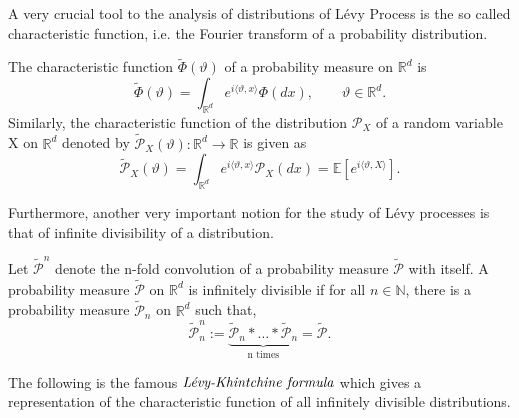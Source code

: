 A very crucial tool to the analysis of distributions of L\'evy Process is the so called characteristic function, i.e. the Fourier transform of a probability distribution.
\begin{definition} The characteristic function $\tilde{\Phi}(\vartheta)$ of a probability measure on $\mathbb{R}^d$ is
\begin{equation}
    \tilde{\Phi}(\vartheta) = \int_{\mathbb{R}^d} e^{i\langle \vartheta,x \rangle} \Phi(dx), \qquad \vartheta \in \mathbb{R}^d.
\end{equation}
Similarly, the characteristic function of the distribution $\mathcal{P}_X$ of a random variable X on $\mathbb{R}^d$ denoted by $\tilde{\mathcal{P}}_X(\vartheta): \mathbb{R}^d \rightarrow  \mathbb{R} $ is given as 
\begin{equation}
\tilde{\mathcal{P}}_X(\vartheta) =  \int_{\mathbb{R}^d} e^{i\langle \vartheta,x \rangle}\mathcal{P}_X(dx) = \mathbb{E}[e^{i\langle \vartheta,X \rangle}].
\end{equation}
\end{definition}
Furthermore, another very important notion for the study of L\'evy processes is that of infinite divisibility of a distribution.
\begin{definition}
Let $\tilde{\mathcal{P}}^n$ denote the n-fold convolution of a probability measure $\tilde{\mathcal{P}}$ with itself. A probability measure $\tilde{\mathcal{P}}$ on  $\mathbb{R}^d$ is infinitely divisible if for all  $n \in \mathbb{N}$, there is a probability measure $\tilde{\mathcal{P}}_n$ on $\mathbb{R}^d$
such that, $$\tilde{\mathcal{P}}^n_n := \underbrace{\tilde{\mathcal{P}}_n * \ldots *\tilde{\mathcal{P}}_n}_\text{n times} = \tilde{\mathcal{P}}. $$ 
\end{definition}
The following is the famous $\emph{L\'evy-Khintchine formula} $ which gives a representation of the characteristic function of all infinitely divisible distributions.
